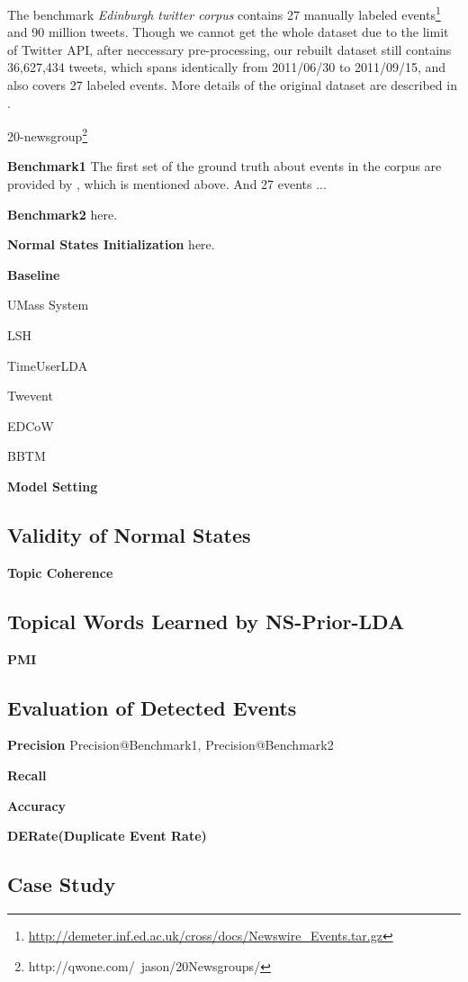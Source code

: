 \documentclass[11pt]{article}
\begin{document}
The benchmark \textit{Edinburgh twitter corpus} contains 27 manually labeled events\cite{petrovic2013can}\footnote{\url{http://demeter.inf.ed.ac.uk/cross/docs/Newswire_Events.tar.gz}} and 90 million tweets. Though we cannot get the whole dataset due to the limit of Twitter API, after neccessary pre-processing, our rebuilt dataset still contains 36,627,434 tweets, which spans identically from 2011/06/30 to 2011/09/15, and also covers 27 labeled events.
More details of the original dataset are described in \cite{petrovic2010edinburgh}.

20-newsgroup\footnote{http://qwone.com/~jason/20Newsgroups/}

\textbf{Benchmark1} The first set of the ground truth about events in the corpus are provided by \cite{petrovic2013can}, which is mentioned above. 
And 27 events ...

\textbf{Benchmark2} here.

\textbf{Normal States Initialization} here.

\textbf{Baseline}

UMass System

LSH

TimeUserLDA

Twevent

EDCoW

BBTM

\textbf{Model Setting}

\subsection{Validity of Normal States}
\textbf{Topic Coherence} \cite{roder2015exploring}
\subsection{Topical Words Learned by NS-Prior-LDA}
\textbf{PMI}
\subsection{Evaluation of Detected Events}
\textbf{Precision} Precision@Benchmark1, Precision@Benchmark2

\textbf{Recall}

\textbf{Accuracy}

\textbf{DERate(Duplicate Event Rate)}
\subsection{Case Study}
\end{document}
